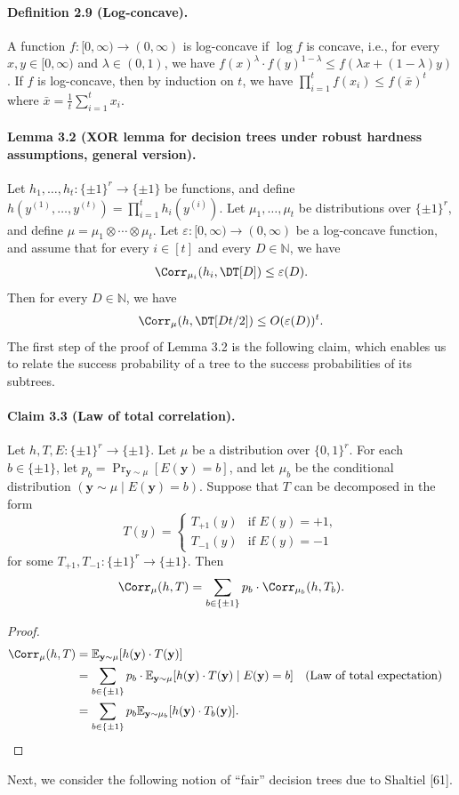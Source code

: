 \paragraph{Definition 2.9 (Log-concave).} A function $f:[0,\infty)\to(0,\infty)$ is log-concave if $\log f$ is concave, i.e., for every $x,y\in[0,\infty)$ and $\lambda\in(0,1)$, we have $f(x)^\lambda\cdot f(y)^{1-\lambda}\le f(\lambda x+(1-\lambda)y)$.
If $f$ is log-concave, then by induction on $t$, we have $\prod_{i=1}^t f(x_i)\le f(\bar x)^t$ where $\bar x=\frac1t\sum_{i=1}^t x_i$.
\paragraph{Lemma 3.2 (XOR lemma for decision trees under robust hardness assumptions, general version).}
Let $h_1,\ldots,h_t:\{\pm1\}^r\to\{\pm1\}$ be functions, and define $h(y^{(1)},\ldots,y^{(t)})=\prod_{i=1}^t h_i(y^{(i)})$. Let $\mu_1,\ldots,\mu_t$ be distributions over $\{\pm1\}^r$, and define $\mu=\mu_1\otimes\cdots\otimes\mu_t$. Let $\varepsilon:[0,\infty)\to(0,\infty)$ be a log-concave function, and assume that for every $i\in[t]$ and every $D\in\mathbb N$, we have
\[\Corr_{\mu_i}(h_i,\DT[D])\le\varepsilon(D).\]
Then for every $D\in\mathbb N$, we have
\[\Corr_\mu(h,\DT[Dt/2])\le O(\varepsilon(D))^t.\]
The first step of the proof of Lemma 3.2 is the following claim, which enables us to relate the success probability of a tree to the success probabilities of its subtrees.
\paragraph{Claim 3.3 (Law of total correlation).} Let $h,T,E:\{\pm1\}^r\to\{\pm1\}$. Let $\mu$ be a distribution over $\{0,1\}^r$. For each $b\in\{\pm1\}$, let $p_b=\Pr_{\mathbf y\sim\mu}[E(\mathbf y)=b]$, and let $\mu_b$ be the conditional distribution $(\mathbf y\sim\mu\mid E(\mathbf y)=b)$. Suppose that $T$ can be decomposed in the form
\[T(y)=\begin{cases}T_{+1}(y)&\text{if }E(y)=+1,\\T_{-1}(y)&\text{if }E(y)=-1\end{cases}\]
for some $T_{+1},T_{-1}:\{\pm1\}^r\to\{\pm1\}$. Then
\[\Corr_\mu(h,T)=\sum_{b\in\{\pm1\}}p_b\cdot\Corr_{\mu_b}(h,T_b).\]
\begin{proof}
\begin{align*}
\Corr_\mu(h,T)&=\mathbb E_{\mathbf y\sim\mu}[h(\mathbf y)\cdot T(\mathbf y)]\\
&=\sum_{b\in\{\pm1\}}p_b\cdot\mathbb E_{\mathbf y\sim\mu}[h(\mathbf y)\cdot T(\mathbf y)\mid E(\mathbf y)=b] &&\text{(Law of total expectation)}\\
&=\sum_{b\in\{\pm1\}}p_b\mathbb E_{\mathbf y\sim\mu_b}[h(\mathbf y)\cdot T_b(\mathbf y)].
\end{align*}
\end{proof}
Next, we consider the following notion of ``fair'' decision trees due to Shaltiel [61].
